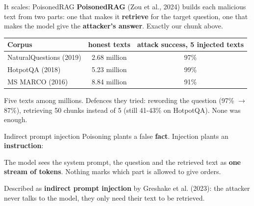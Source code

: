 \begin{frame}{It scales: PoisonedRAG}
  \vspace{0.2em}
  \textbf{PoisonedRAG} (Zou et al., 2024) builds each malicious text from two parts: one that
  makes it \textbf{retrieve} for the target question, one that makes the model give the
  \textbf{attacker's answer}. Exactly our chunk above.

  \vspace{0.3em}
  \begin{center}
  \small
  \begin{tabular}{lcc}
    \toprule
    \textbf{Corpus} & \textbf{honest texts} & \textbf{attack success, 5 injected texts} \\
    \midrule
    NaturalQuestions (2019) & 2.68 million & 97\% \\
    HotpotQA (2018)         & 5.23 million & 99\% \\
    MS MARCO (2016)         & 8.84 million & 91\% \\
    \bottomrule
  \end{tabular}
  \end{center}

  \vspace{0.3em}
  {\small Five texts among millions. Defences they tried: rewording the question (97\% $\to$ 87\%),
  retrieving 50 chunks instead of 5 (still 41-43\% on HotpotQA). None was enough.}
\end{frame}

\begin{frame}{Indirect prompt injection}
  \vspace{0.2em}
  Poisoning plants a false \textbf{fact}. Injection plants an \textbf{instruction}:

  \vspace{0.2em}

  \vspace{-0.1em}
  The model sees the system prompt, the question and the retrieved text as \textbf{one stream of
  tokens}. Nothing marks which part is allowed to give orders.

  \vspace{0.3em}
  {\small Described as \textbf{indirect prompt injection} by Greshake et al. (2023): the attacker
  never talks to the model, they only need their text to be retrieved.}

  \vspace{0.2em}
\end{frame}

